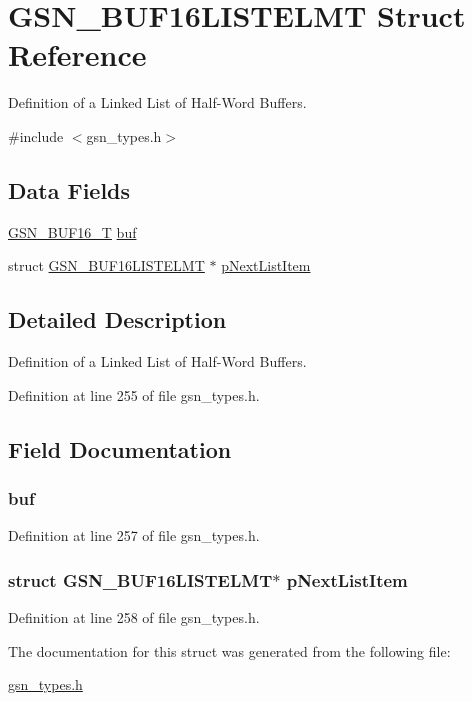 \hypertarget{a00030}{
\section{GSN\_\-BUF16LISTELMT Struct Reference}
\label{a00030}
}


Definition of a Linked List of Half-\/Word Buffers.  




{\ttfamily \#include $<$gsn\_\-types.h$>$}

\subsection*{Data Fields}
\begin{DoxyCompactItemize}
\item 
\hyperlink{a00029}{GSN\_\-BUF16\_\-T} \hyperlink{a00030_ae9b4ad168952716a267fc8af9da1aaa8}{buf}
\item 
struct \hyperlink{a00030}{GSN\_\-BUF16LISTELMT} $\ast$ \hyperlink{a00030_a98f94559e2816dc0cef1aa6da70603f9}{pNextListItem}
\end{DoxyCompactItemize}


\subsection{Detailed Description}
Definition of a Linked List of Half-\/Word Buffers. 

Definition at line 255 of file gsn\_\-types.h.



\subsection{Field Documentation}
\hypertarget{a00030_ae9b4ad168952716a267fc8af9da1aaa8}{
\subsubsection[{buf}]{ {\bf buf}}}
\label{a00030_ae9b4ad168952716a267fc8af9da1aaa8}


Definition at line 257 of file gsn\_\-types.h.

\hypertarget{a00030_a98f94559e2816dc0cef1aa6da70603f9}{
\subsubsection[{pNextListItem}]{\setlength{\rightskip}{0pt plus 5cm}struct {\bf GSN\_\-BUF16LISTELMT}$\ast$ {\bf pNextListItem}}}
\label{a00030_a98f94559e2816dc0cef1aa6da70603f9}


Definition at line 258 of file gsn\_\-types.h.



The documentation for this struct was generated from the following file:\begin{DoxyCompactItemize}
\item 
\hyperlink{a00599}{gsn\_\-types.h}\end{DoxyCompactItemize}
